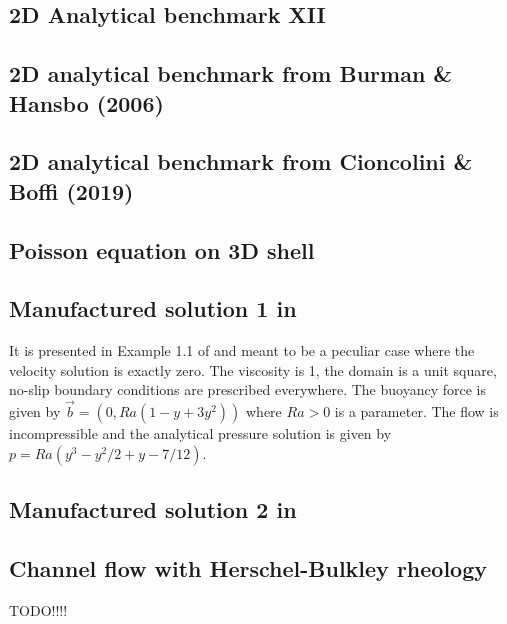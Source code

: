 \subsection{2D Analytical benchmark XII}\label{ss:sofo87_2D}


\subsection{2D analytical benchmark from Burman \& Hansbo (2006)}\label{ss:mms_buha06}


\subsection{2D analytical benchmark from Cioncolini \& Boffi (2019) \label{ss:mms_cibo19}}


\subsection{Poisson equation on 3D shell}
 

\subsection{Manufactured solution 1 in \textcite{jolm17}  \label{ss:mms_jolm17a}}

It is presented in Example 1.1 of \cite{jolm17} and meant to be a peculiar case where the velocity solution 
is exactly zero. The viscosity is 1, the domain is a unit square, no-slip boundary conditions 
are prescribed everywhere. The buoyancy force is given by $\vec{b}=(0,Ra(1-y+3y^2))$ where 
$Ra>0$ is a parameter. The flow is incompressible and the analytical pressure solution 
is given by $p=Ra(y^3-y^2/2+y-7/12)$.

\subsection{Manufactured solution 2 in \textcite{jolm17}  \label{ss:mms_jolm17}}


\subsection{Channel flow with Herschel-Bulkley rheology \label{ss:HBflow}}
 TODO!!!!


